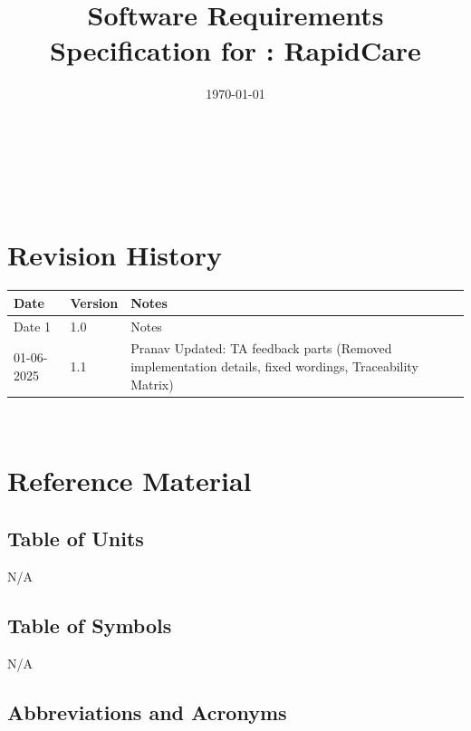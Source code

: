 \documentclass[12pt]{article}
\begin{document}
\title{Software Requirements Specification for \progname: RapidCare}
\author{\authname}
\date{\today}
	
\maketitle

~\newpage


\tableofcontents

~\newpage

\section*{Revision History}

\begin{tabularx}{\textwidth}{p{3cm}p{2cm}X}
\toprule {\bf Date} & {\bf Version} & {\bf Notes}\\
\midrule
Date 1 & 1.0 & Notes\\
01-06-2025 & 1.1 & Pranav Updated: TA feedback parts (Removed implementation details, fixed wordings, Traceability Matrix)\\
\bottomrule
\end{tabularx}

~\newpage

\section{Reference Material}

\subsection{Table of Units}
N/A

\subsection{Table of Symbols}
N/A

\subsection{Abbreviations and Acronyms}
\end{document}
